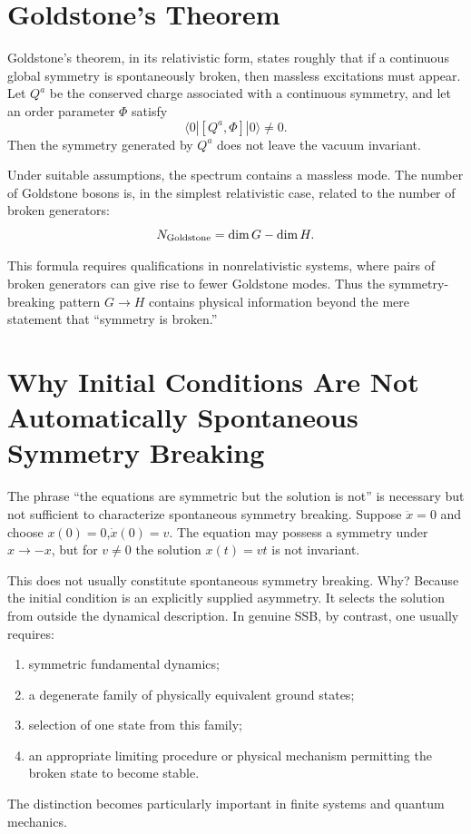\section{ Goldstone's Theorem}
\label{sp:gt}

Goldstone's theorem, in its relativistic form, states roughly that if a
continuous global symmetry is spontaneously broken, then massless excitations
must appear. Let $Q^a$ be the conserved charge associated with a continuous
symmetry, and let an order parameter $\Phi$ satisfy
\[\langle0|[Q^a,\Phi]|0\rangle\neq0.\]
Then the symmetry generated by $Q^a$ does not leave the vacuum invariant.

Under suitable assumptions, the spectrum contains a massless mode.
The number of Goldstone bosons is, in the simplest relativistic case, related
to the number of broken generators:
\[N_{\rm Goldstone}=\dim G-\dim H.\]

This formula requires qualifications in nonrelativistic systems, where pairs of
broken generators can give rise to fewer Goldstone modes.
Thus the symmetry-breaking pattern $G\rightarrow H$
contains physical information beyond the mere statement that ``symmetry is broken.''

\section{Why Initial Conditions Are Not Automatically Spontaneous Symmetry Breaking}
\label{sp:ssb2}

The phrase ``the equations are symmetric but the solution is not'' is necessary
but not sufficient to characterize spontaneous symmetry breaking.
Suppose $\ddot{x}=0$ and choose $x(0)=0$,$\dot{x}(0)=v$.
The equation may possess a symmetry under $x\rightarrow-x$,
but for $v\neq0$ the solution $x(t)=vt$ is not invariant.

This does not usually constitute spontaneous symmetry breaking.
Why?
Because the initial condition is an explicitly supplied asymmetry.  It selects
the solution from outside the dynamical description.
In genuine SSB, by contrast, one usually requires:
\begin{enumerate}
\item symmetric fundamental dynamics;
\item a degenerate family of physically equivalent ground states;
\item selection of one state from this family;
\item an appropriate limiting procedure or physical mechanism permitting the
    broken state to become stable.
\end{enumerate}
The distinction becomes particularly important in finite systems and quantum mechanics.

